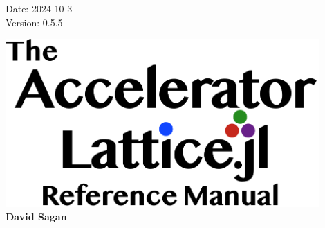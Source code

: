 
\thispagestyle{empty}

\hfill
\parbox[b]{1.8in}{\large
  Date: 2024-10-3 \\
  Version: 0.5.5
}


\vfill

{
\begin{center}
\includegraphics[width=12cm]{AcceleratorLattice-manual-logo.pdf} \\
\vskip 0.3in
\huge\bf David Sagan
\end{center}
}

\vfill
\break
